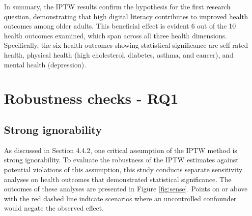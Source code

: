 In summary, the IPTW results confirm the hypothesis for the first research question, demonstrating that high digital literacy contributes to improved health outcomes among older adults. This beneficial effect is evident 6 out of the 10 health outcomes examined, which span across all three health dimensions. Specifically, the six health outcomes showing statistical significance are self-rated health, physical health (high cholesterol, diabetes, asthma, and cancer), and mental health (depression).

\section{Robustness checks - RQ1}

\subsection{Strong ignorability}
As discussed in Section 4.4.2, one critical assumption of the IPTW method is strong ignorability. To evaluate the robustness of the IPTW estimates against potential violations of this assumption, this study conducts separate sensitivity analyses on health outcomes that demonstrated statistical significance. The outcomes of these analyses are presented in Figure \ref{fig:sense}. Points on or above with the red dashed line indicate scenarios where an uncontrolled confounder would negate the observed effect.

